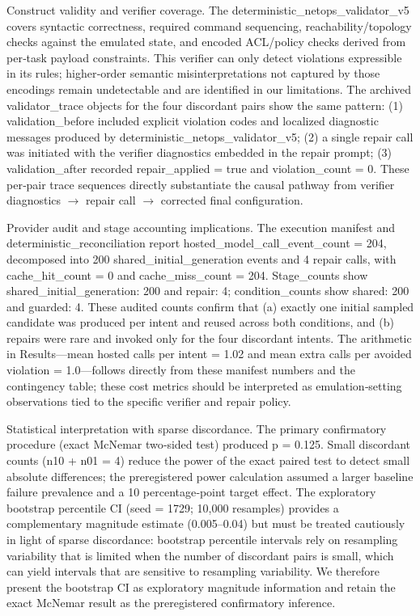 \documentclass[conference]{IEEEtran}
\begin{document}
Construct validity and verifier coverage. The deterministic\_netops\_validator\_v5 covers syntactic correctness, required command sequencing, reachability/topology checks against the emulated state, and encoded ACL/policy checks derived from per‑task payload constraints. This verifier can only detect violations expressible in its rules; higher‑order semantic misinterpretations not captured by those encodings remain undetectable and are identified in our limitations. The archived validator\_trace objects for the four discordant pairs show the same pattern: (1) validation\_before included explicit violation codes and localized diagnostic messages produced by deterministic\_netops\_validator\_v5; (2) a single repair call was initiated with the verifier diagnostics embedded in the repair prompt; (3) validation\_after recorded repair\_applied = true and violation\_count = 0. These per‑pair trace sequences directly substantiate the causal pathway from verifier diagnostics \ensuremath{\rightarrow} repair call \ensuremath{\rightarrow} corrected final configuration.

Provider audit and stage accounting implications. The execution manifest and deterministic\_reconciliation report hosted\_model\_call\_event\_count = 204, decomposed into 200 shared\_initial\_generation events and 4 repair calls, with cache\_hit\_count = 0 and cache\_miss\_count = 204. Stage\_counts show shared\_initial\_generation: 200 and repair: 4; condition\_counts show shared: 200 and guarded: 4. These audited counts confirm that (a) exactly one initial sampled candidate was produced per intent and reused across both conditions, and (b) repairs were rare and invoked only for the four discordant intents. The arithmetic in Results---mean hosted calls per intent = 1.02 and mean extra calls per avoided violation = 1.0---follows directly from these manifest numbers and the contingency table; these cost metrics should be interpreted as emulation‑setting observations tied to the specific verifier and repair policy.

Statistical interpretation with sparse discordance. The primary confirmatory procedure (exact McNemar two‑sided test) produced p = 0.125. Small discordant counts (n10 + n01 = 4) reduce the power of the exact paired test to detect small absolute differences; the preregistered power calculation assumed a larger baseline failure prevalence and a 10 percentage‑point target effect. The exploratory bootstrap percentile CI (seed = 1729; 10,000 resamples) provides a complementary magnitude estimate (0.005--0.04) but must be treated cautiously in light of sparse discordance: bootstrap percentile intervals rely on resampling variability that is limited when the number of discordant pairs is small, which can yield intervals that are sensitive to resampling variability. We therefore present the bootstrap CI as exploratory magnitude information and retain the exact McNemar result as the preregistered confirmatory inference.
\end{document}
